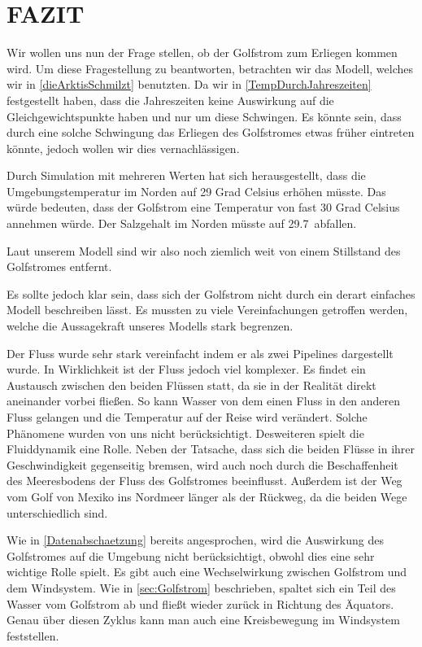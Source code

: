 \documentclass[a4paper,twoside]{article}
\begin{document}
	\section{\uppercase{Fazit}}\label{sec:Fazit}
	
	Wir wollen uns nun der Frage stellen, ob der Golfstrom zum Erliegen kommen wird. Um diese Fragestellung zu beantworten, betrachten wir das Modell, welches wir in \ref{dieArktisSchmilzt} benutzten. Da wir in \ref{TempDurchJahreszeiten} festgestellt haben, dass die Jahreszeiten keine Auswirkung auf die Gleichgewichtspunkte haben und nur um diese Schwingen. Es könnte sein, dass durch eine solche Schwingung das Erliegen des Golfstromes etwas früher eintreten könnte, jedoch wollen wir dies vernachlässigen.
	
	Durch Simulation mit mehreren Werten hat sich herausgestellt, dass die Umgebungstemperatur im Norden auf 29 Grad Celsius erhöhen müsste. Das würde bedeuten, dass der Golfstrom eine Temperatur von fast 30 Grad Celsius annehmen würde. Der Salzgehalt im Norden müsste auf 29.7\textperthousand ~abfallen. 
	
	Laut unserem Modell sind wir also noch ziemlich weit von einem Stillstand des Golfstromes entfernt. 
	
	Es sollte jedoch klar sein, dass sich der Golfstrom nicht durch ein derart einfaches Modell beschreiben lässt. Es mussten zu viele Vereinfachungen getroffen werden, welche die Aussagekraft unseres Modells stark begrenzen. 
	
	Der Fluss wurde sehr stark vereinfacht indem er als zwei Pipelines dargestellt wurde. In Wirklichkeit ist der Fluss jedoch viel komplexer. Es findet ein Austausch zwischen den beiden Flüssen statt, da sie in der Realität direkt aneinander vorbei fließen. So kann Wasser von dem einen Fluss in den anderen Fluss gelangen und die Temperatur auf der Reise wird verändert. Solche Phänomene wurden von uns nicht berücksichtigt. Desweiteren spielt die Fluiddynamik eine Rolle. Neben der Tatsache, dass sich die beiden Flüsse in ihrer Geschwindigkeit gegenseitig bremsen, wird auch noch durch die Beschaffenheit des Meeresbodens der Fluss des Golfstromes beeinflusst. Außerdem ist der Weg vom Golf von Mexiko ins Nordmeer länger als der Rückweg, da die beiden Wege unterschiedlich sind.
	
	Wie in \ref{Datenabschaetzung} bereits angesprochen, wird die Auswirkung des Golfstromes auf die Umgebung nicht berücksichtigt, obwohl dies eine sehr wichtige Rolle spielt. Es gibt auch eine Wechselwirkung zwischen Golfstrom und dem Windsystem. Wie in \ref{sec:Golfstrom} beschrieben, spaltet sich ein Teil des Wasser vom Golfstrom ab und fließt wieder zurück in Richtung des Äquators. Genau über diesen Zyklus kann man auch eine Kreisbewegung im Windsystem feststellen.
	
\end{document}
